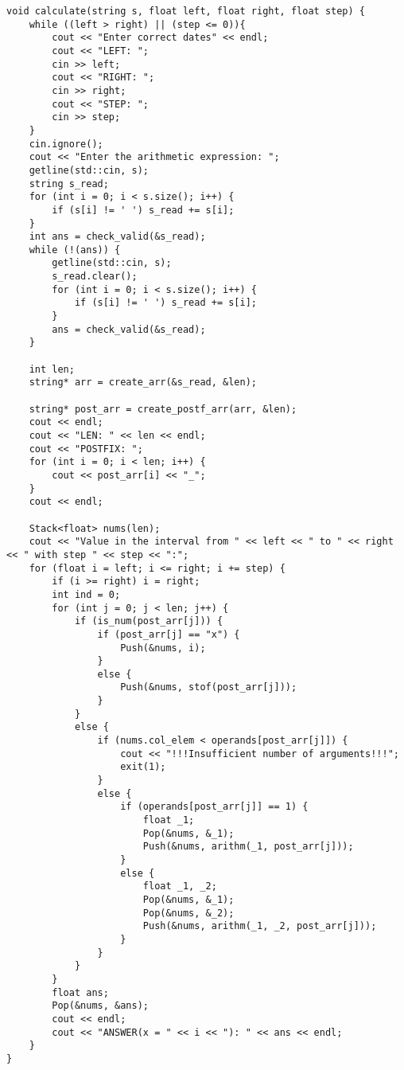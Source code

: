 \begin{lstlisting}[label = list5, caption = Программная реализация функции вычисления выражений в постфиксной записи]
void calculate(string s, float left, float right, float step) {
	while ((left > right) || (step <= 0)){
		cout << "Enter correct dates" << endl;
		cout << "LEFT: ";
		cin >> left;
		cout << "RIGHT: ";
		cin >> right;
		cout << "STEP: ";
		cin >> step;
	}
	cin.ignore();
	cout << "Enter the arithmetic expression: ";
	getline(std::cin, s);
	string s_read;
	for (int i = 0; i < s.size(); i++) {
		if (s[i] != ' ') s_read += s[i];
	}
	int ans = check_valid(&s_read);
	while (!(ans)) {
		getline(std::cin, s);
		s_read.clear();
		for (int i = 0; i < s.size(); i++) {
			if (s[i] != ' ') s_read += s[i];
		}
		ans = check_valid(&s_read);
	}
	
	int len;
	string* arr = create_arr(&s_read, &len);
	
	string* post_arr = create_postf_arr(arr, &len);
	cout << endl;
	cout << "LEN: " << len << endl;
	cout << "POSTFIX: ";
	for (int i = 0; i < len; i++) {
		cout << post_arr[i] << "_";
	}
	cout << endl;
	
	Stack<float> nums(len);
	cout << "Value in the interval from " << left << " to " << right << " with step " << step << ":";
	for (float i = left; i <= right; i += step) {
		if (i >= right) i = right;
		int ind = 0;
		for (int j = 0; j < len; j++) {
			if (is_num(post_arr[j])) {
				if (post_arr[j] == "x") {
					Push(&nums, i);
				}
				else {
					Push(&nums, stof(post_arr[j]));
				}
			}
			else {
				if (nums.col_elem < operands[post_arr[j]]) {
					cout << "!!!Insufficient number of arguments!!!";
					exit(1);
				}
				else {
					if (operands[post_arr[j]] == 1) {
						float _1;
						Pop(&nums, &_1);
						Push(&nums, arithm(_1, post_arr[j]));
					}
					else {
						float _1, _2;
						Pop(&nums, &_1);
						Pop(&nums, &_2);
						Push(&nums, arithm(_1, _2, post_arr[j]));
					}
				}
			}
		}
		float ans;
		Pop(&nums, &ans);
		cout << endl;
		cout << "ANSWER(x = " << i << "): " << ans << endl;
	}
}
\end{lstlisting}

\clearpage
